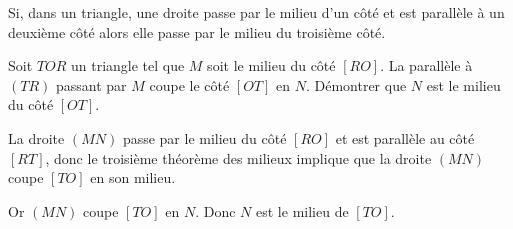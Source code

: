

\begin{theorem}
    Si, dans un triangle, une droite passe par le milieu d'un côté et est parallèle à un deuxième côté alors elle passe par le milieu du troisième côté.
\end{theorem}

\begin{example}
Soit $TOR$ un triangle tel que $M$ soit le milieu du côté $[RO]$. La parallèle à $(TR)$ passant par $M$ coupe le côté $[OT]$ en $N$. Démontrer que $N$ est le milieu du côté $[OT]$.    

\begin{center}
   
\end{center}

La droite \( (MN)\) passe par le milieu du côté \( [RO]\) et est parallèle au côté \( [RT]\), donc le troisième théorème des milieux implique que la droite \( (MN)\) coupe \( [TO]\) en son milieu.

Or \( (MN)\) coupe \( [TO]\) en \( N\). Donc \( N\) est le milieu de \( [TO]\).

\end{example}
